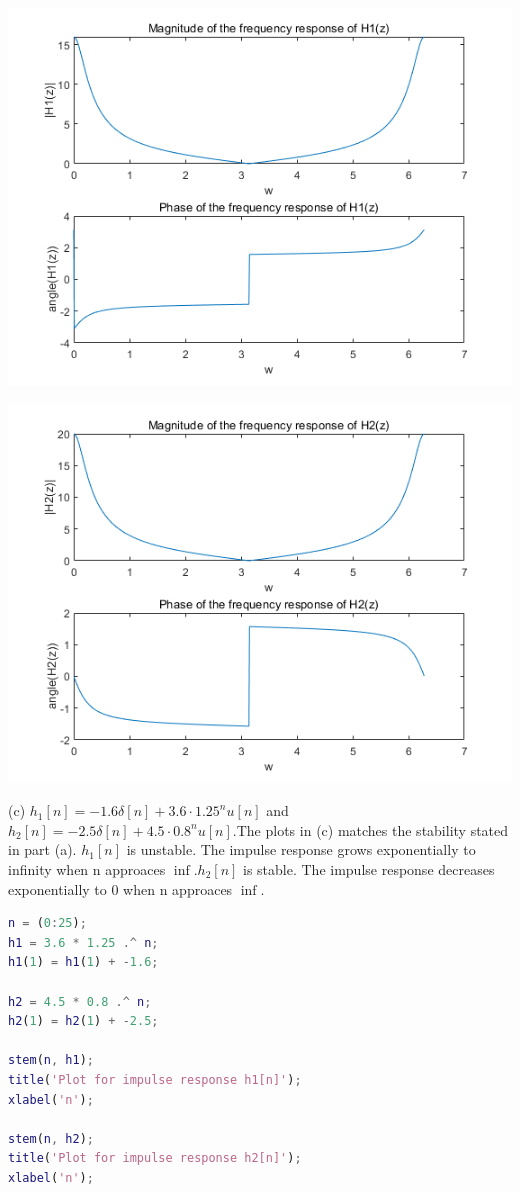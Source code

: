 \documentclass{article}
\begin{document}
\includegraphics[width=\textwidth]{QuestionTwoB1.png}

\includegraphics[width=\textwidth]{QuestionTwoB2.png}

(c) $h_1[n] = -1.6\delta[n]+3.6\cdot1.25^{n}u[n]$ and $h_2[n] = -2.5\delta[n] + 4.5\cdot0.8^{n}u[n]$.The plots in (c) matches the stability stated in part (a). $h_1[n]$ is unstable. The impulse response grows exponentially to infinity when n approaces $\inf$.$h_2[n]$ is stable. The impulse response decreases exponentially to 0 when n approaces $\inf$.

\begin{lstlisting}[language=matlab]
n = (0:25);
h1 = 3.6 * 1.25 .^ n;
h1(1) = h1(1) + -1.6;

h2 = 4.5 * 0.8 .^ n;
h2(1) = h2(1) + -2.5;

stem(n, h1);
title('Plot for impulse response h1[n]');
xlabel('n');

stem(n, h2);
title('Plot for impulse response h2[n]');
xlabel('n');
\end{lstlisting}
\end{document}
